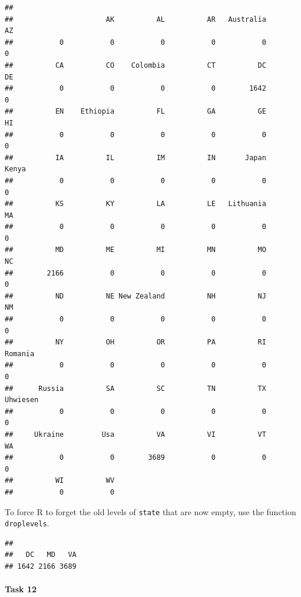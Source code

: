 \documentclass[
]{article}
\newenvironment{Shaded}{\begin{snugshade}}{\end{snugshade}}
\newcommand{\FunctionTok}[1]{\textcolor[rgb]{0.13,0.29,0.53}{\textbf{#1}}}
\newcommand{\NormalTok}[1]{#1}
\newcommand{\OtherTok}[1]{\textcolor[rgb]{0.56,0.35,0.01}{#1}}
\newcommand{\SpecialCharTok}[1]{\textcolor[rgb]{0.81,0.36,0.00}{\textbf{#1}}}
\begin{document}
\begin{verbatim}
## 
##                      AK          AL          AR   Australia          AZ 
##           0           0           0           0           0           0 
##          CA          CO    Colombia          CT          DC          DE 
##           0           0           0           0        1642           0 
##          EN    Ethiopia          FL          GA          GE          HI 
##           0           0           0           0           0           0 
##          IA          IL          IM          IN       Japan       Kenya 
##           0           0           0           0           0           0 
##          KS          KY          LA          LE   Lithuania          MA 
##           0           0           0           0           0           0 
##          MD          ME          MI          MN          MO          NC 
##        2166           0           0           0           0           0 
##          ND          NE New Zealand          NH          NJ          NM 
##           0           0           0           0           0           0 
##          NY          OH          OR          PA          RI     Romania 
##           0           0           0           0           0           0 
##      Russia          SA          SC          TN          TX    Uhwiesen 
##           0           0           0           0           0           0 
##     Ukraine         Usa          VA          VI          VT          WA 
##           0           0        3689           0           0           0 
##          WI          WV 
##           0           0
\end{verbatim}

To force R to forget the old levels of \texttt{state} that are now
empty, use the function \texttt{droplevels}.

\begin{Shaded}
\end{Shaded}

\begin{verbatim}
## 
##   DC   MD   VA 
## 1642 2166 3689
\end{verbatim}

\paragraph{Task 12}\label{task-12}
\end{document}
